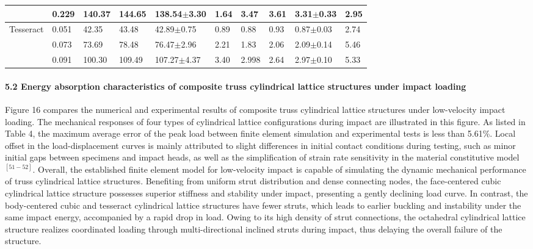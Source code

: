 \documentclass{article} %
\begin{document}
\begin{tabular}{|p{0.5in}|p{0.4in}|p{0.4in}|p{0.5in}|p{0.6in}|p{0.4in}|p{0.4in}|p{0.5in}|p{0.6in}|p{0.4in}|}
 & 0.229 & 140.37 & 144.65 & 138.54\newline $\mathrm{\pm}$3.30 & 1.64 & 3.47 & 3.61 & 3.31\newline $\mathrm{\pm}$0.33 & 2.95 \\ \hline 
Tesseract & 0.051 & 42.35 & 43.48 & 42.89\newline $\mathrm{\pm}$0.75 & 0.89 & 0.88 & 0.93 & 0.87\newline $\mathrm{\pm}$0.03 & 2.74 \\ \hline 
 & 0.073 & 73.69 & 78.48 & 76.47\newline $\mathrm{\pm}$2.96 & 2.21 & 1.83 & 2.06 & 2.09\newline $\mathrm{\pm}$0.14 & 5.46 \\ \hline 
 & 0.091 & 100.30 & 109.49 & 107.27\newline $\mathrm{\pm}$4.37 & 3.40 & 2.998 & 2.64 & 2.97\newline $\mathrm{\pm}$0.10 & 5.33 \\ \hline 
\end{tabular}


\paragraph{5.2 Energy absorption characteristics of composite truss cylindrical lattice structures under impact loading}

Figure 16 compares the numerical and experimental results of composite truss cylindrical lattice structures under low-velocity impact loading. The mechanical responses of four types of cylindrical lattice configurations during impact are illustrated in this figure. As listed in Table 4, the maximum average error of the peak load between finite element simulation and experimental tests is less than 5.61\%. Local offset in the load-displacement curves is mainly attributed to slight differences in initial contact conditions during testing, such as minor initial gaps between specimens and impact heads, as well as the simplification of strain rate sensitivity in the material constitutive model${}^{[51-52]}$. Overall, the established finite element model for low-velocity impact is capable of simulating the dynamic mechanical performance of truss cylindrical lattice structures. Benefiting from uniform strut distribution and dense connecting nodes, the face-centered cubic cylindrical lattice structure possesses superior stiffness and stability under impact, presenting a gently declining load curve. In contrast, the body-centered cubic and tesseract cylindrical lattice structures have fewer struts, which leads to earlier buckling and instability under the same impact energy, accompanied by a rapid drop in load. Owing to its high density of strut connections, the octahedral cylindrical lattice structure realizes coordinated loading through multi-directional inclined struts during impact, thus delaying the overall failure of the structure.
\end{document}
